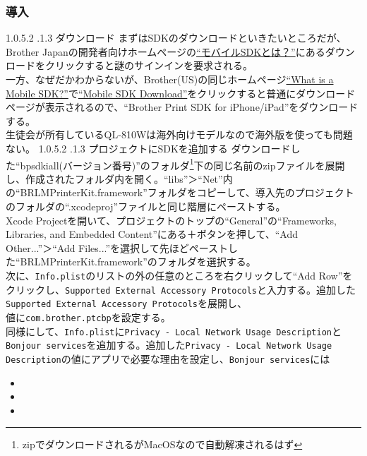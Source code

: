 \documentclass[dvipdfmx,jb5]{jarticle}
\makeatletter
\newcommand{\subsubsubsection}{\@startsection{paragraph}{4}{\z@}%
    {1.0\Cvs \@plus.5\Cdp \@minus.2\Cdp}%
    {.1\Cvs \@plus.3\Cdp}%
    {\large \bfseries}
  }
\newcommand{\link}[2]{\href{#2}{#1}}
\makeatother
\begin{document}
 \subsubsection{導入}
  \subsubsubsection{ダウンロード}
  まずはSDKのダウンロードといきたいところだが、Brother Japanの開発者向けホームページの\link{``モバイルSDKとは？''}{https://support.brother.co.jp/j/s/es/dev/ja/mobilesdk/index.html?c=jp&lang=ja&navi=offall&comple=on&redirect=on}にあるダウンロードをクリックすると謎のサインインを要求される。 \\
  一方、なぜだかわからないが、Brother(US)の同じホームページ\link{``What is a Mobile SDK?''}{https://support.brother.com/g/s/es/dev/en/mobilesdk/index.html?c=eu_ot&lang=en&navi=offall&comple=on&redirect=on}で\link{``Mobile SDK Download''}{https://support.brother.com/g/s/es/dev/en/mobilesdk/download/index.html?c=eu_ot&lang=en&navi=offall&comple=on&redirect=on}をクリックすると普通にダウンロードページが表示されるので、``Brother Print SDK for iPhone/iPad''をダウンロードする。\\
  生徒会が所有しているQL-810Wは海外向けモデルなので海外版を使っても問題ない。
 \subsubsubsection{プロジェクトにSDKを追加する}
  ダウンロードした``bpsdkiall(バージョン番号)''のフォルダ\footnote{zipでダウンロードされるがMacOSなので自動解凍されるはず}下の同じ名前のzipファイルを展開し、作成されたフォルダ内を開く。``libs''＞``Net''内の``BRLMPrinterKit.framework''フォルダをコピーして、導入先のプロジェクトのフォルダの``.xcodeproj''ファイルと同じ階層にペーストする。\\
  Xcode Projectを開いて、プロジェクトのトップの``General''の``Frameworks, Libraries, and Embedded Content''にある＋ボタンを押して、``Add Other...''＞``Add Files...''を選択して先ほどペーストした``BRLMPrinterKit.framework''のフォルダを選択する。\\
  次に、\texttt{Info.plist}のリストの外の任意のところを右クリックして``Add Row''をクリックし、\texttt{Supported External Accessory Protocols}と入力する。追加した\texttt{Supported External Accessory Protocols}を展開し、\\値に\texttt{com.brother.ptcbp}を設定する。\\
  同様にして、\texttt{Info.plist}に\texttt{Privacy - Local Network Usage Description}と\texttt{Bonjour services}を追加する。追加した\texttt{Privacy - Local Network Usage Description}の値にアプリで必要な理由を設定し、\texttt{Bonjour services}には
  \begin{itemize}
  \item {}
  \item {}
  \item {}
  \end{itemize}
\end{document}
